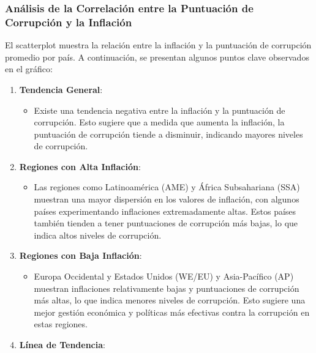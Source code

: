 \documentclass[
]{article}
\providecommand{\tightlist}{%
  \setlength{\itemsep}{0pt}\setlength{\parskip}{0pt}}
\begin{document}
\subsubsection{Análisis de la Correlación entre la Puntuación de
Corrupción y la
Inflación}\label{anuxe1lisis-de-la-correlaciuxf3n-entre-la-puntuaciuxf3n-de-corrupciuxf3n-y-la-inflaciuxf3n}

El scatterplot muestra la relación entre la inflación y la puntuación de
corrupción promedio por país. A continuación, se presentan algunos
puntos clave observados en el gráfico:

\begin{enumerate}
\def\labelenumi{\arabic{enumi}.}
\tightlist
\item
  \textbf{Tendencia General}:

  \begin{itemize}
  \tightlist
  \item
    Existe una tendencia negativa entre la inflación y la puntuación de
    corrupción. Esto sugiere que a medida que aumenta la inflación, la
    puntuación de corrupción tiende a disminuir, indicando mayores
    niveles de corrupción.
  \end{itemize}
\item
  \textbf{Regiones con Alta Inflación}:

  \begin{itemize}
  \tightlist
  \item
    Las regiones como Latinoamérica (AME) y África Subsahariana (SSA)
    muestran una mayor dispersión en los valores de inflación, con
    algunos países experimentando inflaciones extremadamente altas.
    Estos países también tienden a tener puntuaciones de corrupción más
    bajas, lo que indica altos niveles de corrupción.
  \end{itemize}
\item
  \textbf{Regiones con Baja Inflación}:

  \begin{itemize}
  \tightlist
  \item
    Europa Occidental y Estados Unidos (WE/EU) y Asia-Pacífico (AP)
    muestran inflaciones relativamente bajas y puntuaciones de
    corrupción más altas, lo que indica menores niveles de corrupción.
    Esto sugiere una mejor gestión económica y políticas más efectivas
    contra la corrupción en estas regiones.
  \end{itemize}
\item
  \textbf{Línea de Tendencia}:


\end{enumerate}
\end{document}

